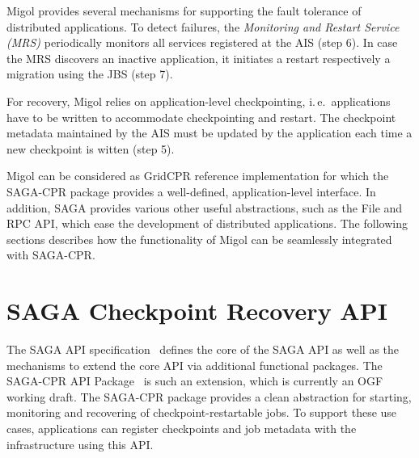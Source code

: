 \documentclass{rspublic}
\newcommand{\up}{}%
\begin{document}
Migol provides several mechanisms for supporting the fault tolerance of 
distributed applications.
To detect failures, the \emph{Monitoring and Restart Service (MRS)}
periodically monitors all services registered at the AIS (step 6). 
In case the MRS discovers an inactive application, 
it initiates a restart respectively a migration using the JBS (step 7).

For recovery, Migol relies on application-level checkpointing, i.\,e.\
applications have to be written to accommodate checkpointing and
restart.  The checkpoint metadata maintained by the AIS must be updated by the application
each time a new checkpoint is witten  (step 5).


Migol can be considered as GridCPR reference implementation for which
the SAGA-CPR package provides a well-defined, application-level
interface.  In addition, SAGA provides various other useful
abstractions, such as the File and RPC API, which ease the development
of distributed applications. The following sections describes how the
functionality of Migol can be seamlessly integrated with SAGA-CPR.



\up
\section{SAGA Checkpoint Recovery API}

\up The SAGA API specification~\cite{saga_gfd90} defines the core of
the SAGA API as well as the mechanisms to extend the core API via
additional functional packages.  The SAGA-CPR API
Package~\cite{saga_cpr_draft} is such an extension, which is currently
an OGF working draft.  The SAGA-CPR package provides a clean
abstraction for starting, monitoring and recovering of
checkpoint-restartable jobs.  To support these use cases, applications
can register checkpoints and job metadata with the infrastructure
using this API.
\end{document}
